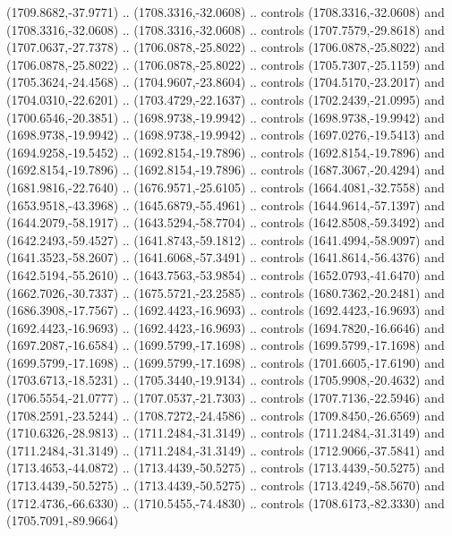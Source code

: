 \begin{scope}[shift={(-22.88722,-49.76189)}]
\begin{scope}[shift={(-739.46591,328.36782)}]
      (1709.8682,-37.9771) .. (1708.3316,-32.0608) .. controls (1708.3316,-32.0608)
      and (1708.3316,-32.0608) .. (1708.3316,-32.0608) .. controls
      (1707.7579,-29.8618) and (1707.0637,-27.7378) .. (1706.0878,-25.8022) ..
      controls (1706.0878,-25.8022) and (1706.0878,-25.8022) .. (1706.0878,-25.8022)
      .. controls (1705.7307,-25.1159) and (1705.3624,-24.4568) ..
      (1704.9607,-23.8604) .. controls (1704.5170,-23.2017) and (1704.0310,-22.6201)
      .. (1703.4729,-22.1637) .. controls (1702.2439,-21.0995) and
      (1700.6546,-20.3851) .. (1698.9738,-19.9942) .. controls (1698.9738,-19.9942)
      and (1698.9738,-19.9942) .. (1698.9738,-19.9942) .. controls
      (1697.0276,-19.5413) and (1694.9258,-19.5452) .. (1692.8154,-19.7896) ..
      controls (1692.8154,-19.7896) and (1692.8154,-19.7896) .. (1692.8154,-19.7896)
      .. controls (1687.3067,-20.4294) and (1681.9816,-22.7640) ..
      (1676.9571,-25.6105) .. controls (1664.4081,-32.7558) and (1653.9518,-43.3968)
      .. (1645.6879,-55.4961) .. controls (1644.9614,-57.1397) and
      (1644.2079,-58.1917) .. (1643.5294,-58.7704) .. controls (1642.8508,-59.3492)
      and (1642.2493,-59.4527) .. (1641.8743,-59.1812) .. controls
      (1641.4994,-58.9097) and (1641.3523,-58.2607) .. (1641.6068,-57.3491) ..
      controls (1641.8614,-56.4376) and (1642.5194,-55.2610) .. (1643.7563,-53.9854)
      .. controls (1652.0793,-41.6470) and (1662.7026,-30.7337) ..
      (1675.5721,-23.2585) .. controls (1680.7362,-20.2481) and (1686.3908,-17.7567)
      .. (1692.4423,-16.9693) .. controls (1692.4423,-16.9693) and
      (1692.4423,-16.9693) .. (1692.4423,-16.9693) .. controls (1694.7820,-16.6646)
      and (1697.2087,-16.6584) .. (1699.5799,-17.1698) .. controls
      (1699.5799,-17.1698) and (1699.5799,-17.1698) .. (1699.5799,-17.1698) ..
      controls (1701.6605,-17.6190) and (1703.6713,-18.5231) .. (1705.3440,-19.9134)
      .. controls (1705.9908,-20.4632) and (1706.5554,-21.0777) ..
      (1707.0537,-21.7303) .. controls (1707.7136,-22.5946) and (1708.2591,-23.5244)
      .. (1708.7272,-24.4586) .. controls (1709.8450,-26.6569) and
      (1710.6326,-28.9813) .. (1711.2484,-31.3149) .. controls (1711.2484,-31.3149)
      and (1711.2484,-31.3149) .. (1711.2484,-31.3149) .. controls
      (1712.9066,-37.5841) and (1713.4653,-44.0872) .. (1713.4439,-50.5275) ..
      controls (1713.4439,-50.5275) and (1713.4439,-50.5275) .. (1713.4439,-50.5275)
      .. controls (1713.4249,-58.5670) and (1712.4736,-66.6330) ..
      (1710.5455,-74.4830) .. controls (1708.6173,-82.3330) and (1705.7091,-89.9664)

\end{scope}
\end{scope}
